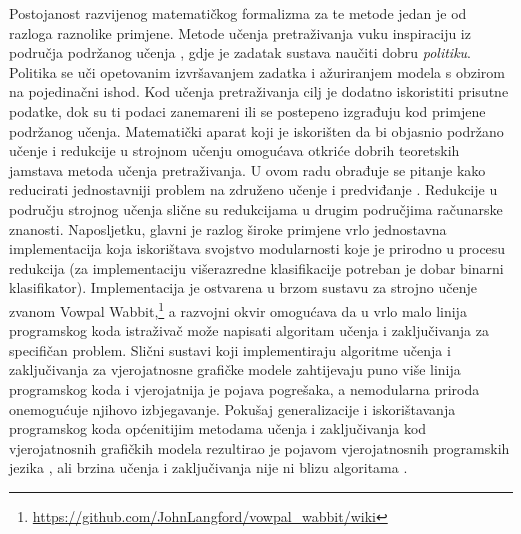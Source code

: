 Postojanost razvijenog matematičkog formalizma za te metode jedan je od razloga
raznolike primjene. Metode učenja pretraživanja vuku inspiraciju iz područja
podržanog učenja  \citep{sutton1998reinforcement},
gdje je zadatak sustava naučiti dobru \emph{politiku}. Politika se uči
opetovanim izvršavanjem zadatka i ažuriranjem modela s obzirom na pojedinačni
ishod. Kod učenja pretraživanja cilj je dodatno iskoristiti prisutne podatke,
dok su ti podaci zanemareni ili se postepeno izgrađuju kod primjene podržanog
učenja. Matematički aparat koji je iskorišten da bi objasnio podržano učenje i
redukcije u strojnom učenju  omogućava otkriće
dobrih teoretskih jamstava metoda učenja pretraživanja. U ovom radu obrađuje se
pitanje kako reducirati jednostavniji problem na združeno učenje i predviđanje
. Redukcije u području strojnog učenja
slične su redukcijama u drugim područjima računarske znanosti. Naposljetku,
glavni je razlog široke primjene vrlo jednostavna implementacija koja
iskorištava svojstvo modularnosti koje je prirodno u procesu redukcija (za
implementaciju višerazredne klasifikacije potreban je dobar binarni
klasifikator). Implementacija je ostvarena u brzom sustavu za strojno učenje
zvanom Vowpal
Wabbit,\footnote{\url{https://github.com/JohnLangford/vowpal_wabbit/wiki}} a
razvojni okvir \lts{} omogućava da u vrlo malo linija programskog koda
istraživač može napisati algoritam učenja i zaključivanja za specifičan problem.
Slični sustavi koji implementiraju algoritme učenja i zaključivanja za
vjerojatnosne grafičke modele zahtijevaju puno više linija programskog koda i
vjerojatnija je pojava pogrešaka, a nemodularna priroda onemogućuje njihovo
izbjegavanje. Pokušaj generalizacije i iskorištavanja programskog koda
općenitijim metodama učenja i zaključivanja kod vjerojatnosnih grafičkih modela
rezultirao je pojavom vjerojatnosnih programskih jezika , ali brzina učenja i zaključivanja nije ni blizu
algoritama \lts{}.

